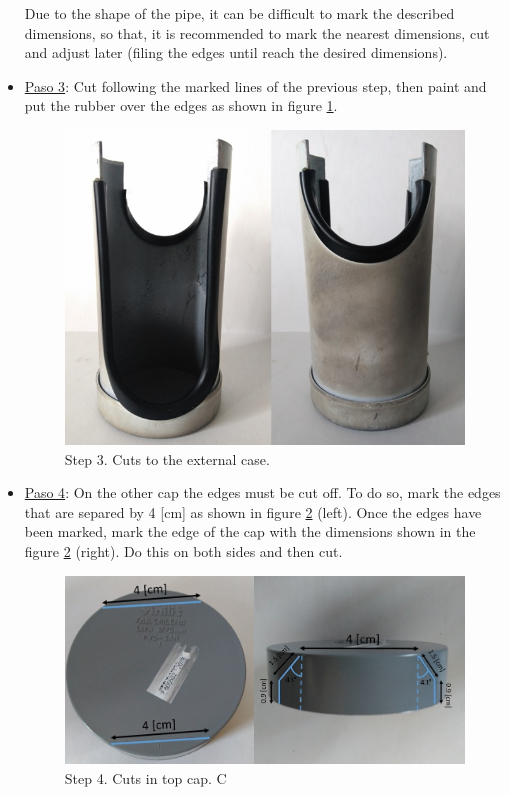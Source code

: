 \documentclass[12pt,letterpaper]{article}
\numberwithin{figure}{section}
\numberwithin{equation}{section}
\numberwithin{table}{section}
\begin{document}
\begin{itemize}
Due to the shape of the pipe, it can be difficult to mark the described dimensions, so that, it is recommended to mark the nearest dimensions, cut and adjust later (filing the edges until reach the desired dimensions).

\item \underline{Paso 3}: Cut following the marked lines of the previous step, then paint and put the rubber over the edges as shown in figure \ref{fig:38}.

    \begin{figure}[H]
        \centering
        \includegraphics[scale=0.6]{Figuras/figure_38.jpg}
        \caption{Step 3. Cuts to the external case.}
        \label{fig:38}    
    \end{figure}
    
\item \underline{Paso 4}: On the other cap the edges must be cut off. To do so, mark the edges that are separed by 4 [cm] as shown in figure \ref{fig:39} (left). Once the edges have been marked, mark the edge of the cap with the dimensions shown in the figure \ref{fig:39} (right). Do this on both sides and then cut.

    \begin{figure}[H]
        \centering
        \includegraphics[scale=0.5]{Figuras/figure_39.jpg}
        \caption{Step 4. Cuts in top cap. C}
        \label{fig:39}    
    \end{figure}
    

\end{itemize}
\end{document}
